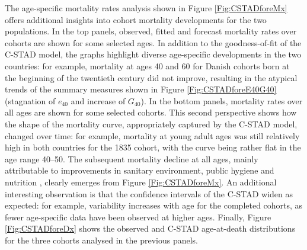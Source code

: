 \documentclass[11pt, a4paper]{article}
\begin{document}
The age-specific mortality rates analysis shown in Figure \ref{Fig:CSTADforeMx} offers additional insights into cohort mortality developments for the two populations. In the top panels, observed, fitted and forecast mortality rates over cohorts are shown for some selected ages. In addition to the goodness-of-fit of the C-STAD model, the graphs highlight diverse age-specific developments in the two countries: for example, mortality at ages 40 and 60 for Danish cohorts born at the beginning of the twentieth century did not improve, resulting in the atypical trends of the summary measures shown in Figure \ref{Fig:CSTADforeE40G40} (stagnation of $e_{40}$ and increase of $G_{40}$). In the bottom panels, mortality rates over all ages are shown for some selected cohorts. This second perspective shows how the shape of the mortality curve, appropriately captured by the C-STAD model, changed over time: for example, mortality at young adult ages was still relatively high in both countries for the 1835 cohort, with the curve being rather flat in the age range 40--50. The subsequent mortality decline at all ages, mainly attributable to improvements in sanitary environment, public hygiene and nutrition \citep{mckeown1976modern}, clearly emerges from Figure \ref{Fig:CSTADforeMx}. An additional interesting observation is that the confidence intervals of the C-STAD widen as expected: for example, variability increases with age for the completed cohorts, as fewer age-specific data have been observed at higher ages. Finally, Figure \ref{Fig:CSTADforeDx} shows the observed and C-STAD age-at-death distributions for the three cohorts analysed in the previous panels. 
\end{document}

